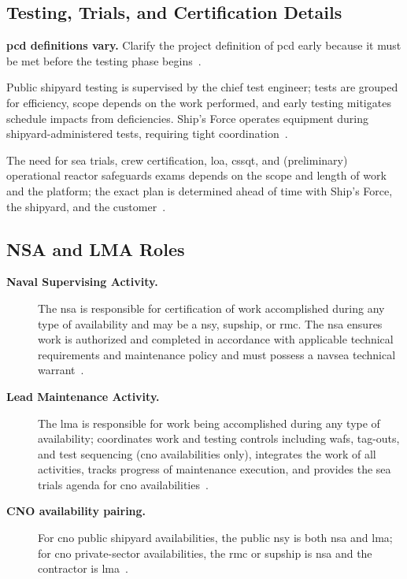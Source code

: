 \documentclass[../main.tex]{subfiles}
\begin{document}
\subsection{Testing, Trials, and Certification Details}
\begin{description}
  \item \textbf{\ac{pcd} definitions vary.} Clarify the project definition of \ac{pcd} early because it must be met before the testing phase begins~\autocite{edo-4-2-2-cno-availability-execution-2025}.
  \item[\textbf{Testing governance.}] Public shipyard testing is supervised by the chief test engineer; tests are grouped for efficiency, scope depends on the work performed, and early testing mitigates schedule impacts from deficiencies. Ship's Force operates equipment during shipyard-administered tests, requiring tight coordination~\autocite{edo-4-2-2-cno-availability-execution-2025}.
  \item[\textbf{Trials and certification.}] The need for sea trials, crew certification, \ac{loa}, \ac{cssqt}, and (preliminary) operational reactor safeguards exams depends on the scope and length of work and the platform; the exact plan is determined ahead of time with Ship's Force, the shipyard, and the customer~\autocite{edo-4-2-2-cno-availability-execution-2025}.
\end{description}

\subsection{NSA and LMA Roles}
\begin{description}
  \item[\textbf{Naval Supervising Activity.}] The \ac{nsa} is responsible for certification of work accomplished during any type of availability and may be a \ac{nsy}, \ac{supship}, or \ac{rmc}. The \ac{nsa} ensures work is authorized and completed in accordance with applicable technical requirements and maintenance policy and must possess a \ac{navsea} technical warrant~\autocite{edo-4-2-2-cno-availability-execution-2025}.
  \item[\textbf{Lead Maintenance Activity.}] The \ac{lma} is responsible for work being accomplished during any type of availability; coordinates work and testing controls including \acp{waf}, tag-outs, and test sequencing (\ac{cno} availabilities only), integrates the work of all activities, tracks progress of maintenance execution, and provides the sea trials agenda for \ac{cno} availabilities~\autocite{edo-4-2-2-cno-availability-execution-2025}.
  \item[\textbf{CNO availability pairing.}] For \ac{cno} public shipyard availabilities, the public \ac{nsy} is both \ac{nsa} and \ac{lma}; for \ac{cno} private-sector availabilities, the \ac{rmc} or \ac{supship} is \ac{nsa} and the contractor is \ac{lma}~\autocite{edo-4-2-2-cno-availability-execution-2025}.
\end{description}
\end{document}
